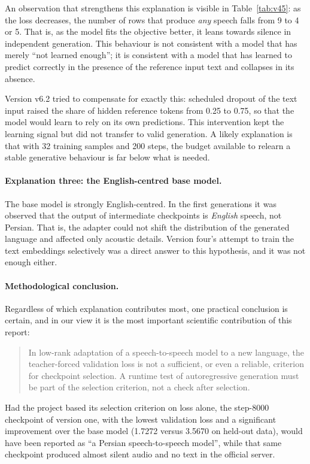 An observation that strengthens this explanation is visible in Table~\ref{tab:v45}: as the loss
decreases, the number of rows that produce \emph{any} speech falls from 9 to 4 or 5. That is, as
the model fits the objective better, it leans towards silence in independent generation. This
behaviour is not consistent with a model that has merely ``not learned enough''; it is
consistent with a model that has learned to predict correctly in the presence of the reference
input text and collapses in its absence.

Version v6.2 tried to compensate for exactly this: scheduled dropout of the text input raised
the share of hidden reference tokens from 0.25 to 0.75, so that the model would learn to rely on
its own predictions. This intervention kept the learning signal but did not transfer to valid
generation. A likely explanation is that with 32 training samples and 200 steps, the budget
available to relearn a stable generative behaviour is far below what is needed.

\paragraph{Explanation three: the English-centred base model.} The base model is strongly
English-centred. In the first generations it was observed that the output of intermediate
checkpoints is \emph{English} speech, not Persian. That is, the adapter could not shift the
distribution of the generated language and affected only acoustic details. Version four's
attempt to train the text embeddings selectively was a direct answer to this hypothesis, and it
was not enough either.

\paragraph{Methodological conclusion.} Regardless of which explanation contributes most, one
practical conclusion is certain, and in our view it is the most important scientific
contribution of this report:

\begin{quote}
In low-rank adaptation of a speech-to-speech model to a new language, the teacher-forced
validation loss is not a sufficient, or even a reliable, criterion for checkpoint selection. A
runtime test of autoregressive generation must be part of the selection criterion, not a check
after selection.
\end{quote}

Had the project based its selection criterion on loss alone, the step-8000 checkpoint of version
one, with the lowest validation loss and a significant improvement over the base model (1.7272
versus 3.5670 on held-out data), would have been reported as ``a Persian speech-to-speech
model'', while that same checkpoint produced almost silent audio and no text in the official
server.

